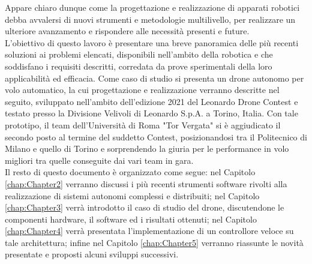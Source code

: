 Appare chiaro dunque come la progettazione e realizzazione di apparati robotici debba avvalersi di nuovi strumenti e metodologie multilivello, per realizzare un ulteriore avanzamento e rispondere alle necessità presenti e future.\\
L'obiettivo di questo lavoro è presentare una breve panoramica delle più recenti soluzioni ai problemi elencati, disponibili nell'ambito della robotica e che soddisfano i requisiti descritti, corredata da prove sperimentali della loro applicabilità ed efficacia. Come caso di studio si presenta un drone autonomo per volo automatico, la cui progettazione e realizzazione verranno descritte nel seguito, sviluppato nell'ambito dell'edizione 2021 del Leonardo Drone Contest e testato presso la Divisione Velivoli di Leonardo S.p.A. a Torino, Italia. Con tale prototipo, il team dell'Università di Roma "Tor Vergata" si è aggiudicato il secondo posto al termine del suddetto Contest, posizionandosi tra il Politecnico di Milano e quello di Torino e sorprendendo la giuria per le performance in volo migliori tra quelle conseguite dai vari team in gara.\\
Il resto di questo documento è organizzato come segue: nel Capitolo \ref{chap:Chapter2} verranno discussi i più recenti strumenti software rivolti alla realizzazione di sistemi autonomi complessi e distribuiti; nel Capitolo \ref{chap:Chapter3} verrà introdotto il caso di studio del drone, discutendone le componenti hardware, il software ed i risultati ottenuti; nel Capitolo \ref{chap:Chapter4} verrà presentata l'implementazione di un controllore veloce su tale architettura; infine nel Capitolo \ref{chap:Chapter5} verranno riassunte le novità presentate e proposti alcuni sviluppi successivi.
